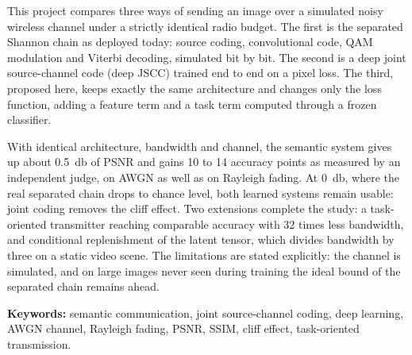 \noindent
This project compares three ways of sending an image over a simulated noisy wireless channel under a
strictly identical radio budget. The first is the separated Shannon chain as deployed today: source
coding, convolutional code, QAM modulation and Viterbi decoding, simulated bit by bit. The second is a
deep joint source-channel code (deep JSCC) trained end to end on a pixel loss. The third, proposed here,
keeps exactly the same architecture and changes only the loss function, adding a feature term and a task
term computed through a frozen classifier.

With identical architecture, bandwidth and channel, the semantic system gives up about \SI{0.5}{\decibel}
of PSNR and gains 10 to 14 accuracy points as measured by an independent judge, on AWGN as well as on
Rayleigh fading. At \SI{0}{\decibel}, where the real separated chain drops to chance level, both learned
systems remain usable: joint coding removes the cliff effect. Two extensions complete the study: a
task-oriented transmitter reaching comparable accuracy with 32 times less bandwidth, and conditional
replenishment of the latent tensor, which divides bandwidth by three on a static video scene. The
limitations are stated explicitly: the channel is simulated, and on large images never seen during
training the ideal bound of the separated chain remains ahead.

\vspace{10pt}
\noindent\textbf{Keywords:} semantic communication, joint source-channel coding, deep learning, AWGN
channel, Rayleigh fading, PSNR, SSIM, cliff effect, task-oriented transmission.
